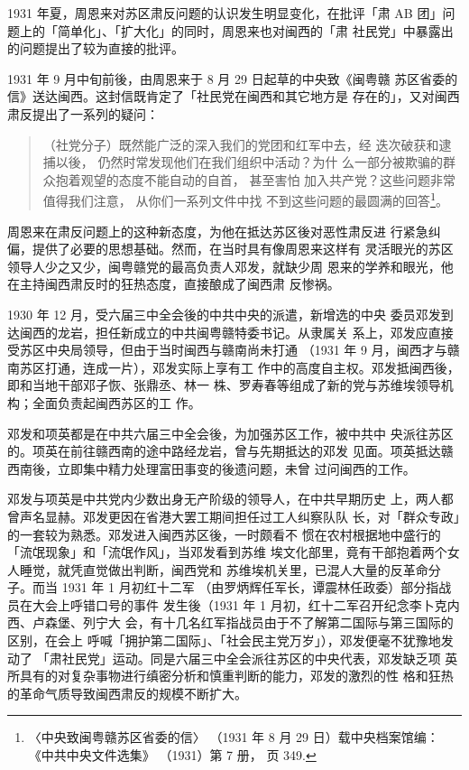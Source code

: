 1931 年夏，周恩来对苏区肃反问题的认识发生明显变化，在批评「肃
AB 团」问题上的「简单化」、「扩大化」的同时，周恩来也对闽西的「肃
社民党」中暴露出的问题提出了较为直接的批评。
 
1931 年 9 月中旬前後，由周恩来于 8 月 29 日起草的中央致《闽粤赣
苏区省委的信》送达闽西。这封信既肯定了「社民党在闽西和其它地方是
存在的」，又对闽西肃反提出了一系列的疑问：
\begin{quote}
	\fzwkai （社党分子）既然能广泛的深入我们的党团和红军中去，经
迭次破获和逮捕以後，
仍然时常发现他们在我们组织中活动？为什
么一部分被欺骗的群众抱着观望的态度不能自动的自首，
甚至害怕
加入共产党？这些问题非常值得我们注意，
从你们一系列文件中找
不到这些问题的最圆满的回答\footnote{〈中央致闽粤赣苏区省委的信〉
（1931 年 8 月 29 日）载中央档案馆编：
《中共中央文件选集》
（1931）第 7 册，
页 349.}。
\end{quote}

周恩来在肃反问题上的这种新态度，为他在抵达苏区後对恶性肃反进
行紧急纠偏，提供了必要的思想基础。然而，在当时具有像周恩来这样有
灵活眼光的苏区领导人少之又少，闽粤赣党的最高负责人邓发，就缺少周
恩来的学养和眼光，他在主持闽西肃反时的狂热态度，直接酿成了闽西肃
反惨祸。

1930 年 12 月，受六届三中全会後的中共中央的派遣，新增选的中央
委员邓发到达闽西的龙岩，担任新成立的中共闽粤赣特委书记。从隶属关
系上，邓发应直接受苏区中央局领导，但由于当时闽西与赣南尚未打通
（1931 年 9 月，闽西才与赣南苏区打通，连成一片），邓发实际上享有工
作中的高度自主权。邓发抵闽西後，即和当地干部邓子恢、张鼎丞、林一
株、罗寿春等组成了新的党与苏维埃领导机构；全面负责起闽西苏区的工
作。

邓发和项英都是在中共六届三中全会後，为加强苏区工作，被中共中
央派往苏区的。项英在前往赣西南的途中路经龙岩，曾与先期抵达的邓发
见面。项英抵达赣西南後，立即集中精力处理富田事变的後遗问题，未曾
过问闽西的工作。

邓发与项英是中共党内少数出身无产阶级的领导人，在中共早期历史
上，两人都曾声名显赫。邓发更因在省港大罢工期间担任过工人纠察队队
长，对「群众专政」的一套较为熟悉。邓发进入闽西苏区後，一时颇看不
惯在农村根据地中盛行的「流氓现象」和「流氓作风」，当邓发看到苏维
埃文化部里，竟有干部抱着两个女人睡觉，就凭直觉做出判断，闽西党和
苏维埃机关里，已混人大量的反革命分子。而当 1931 年 1 月初红十二军
（由罗炳辉任军长，谭震林任政委）部分指战员在大会上呼错口号的事件
发生後（1931 年 1 月初，红十二军召开纪念李卜克内西、卢森堡、列宁大
会，有十几名红军指战员由于不了解第二国际与第三国际的区别，在会上
呼喊「拥护第二国际」、「社会民主党万岁」），邓发便毫不犹豫地发动了
「肃社民党」运动。同是六届三中全会派往苏区的中央代表，邓发缺乏项
英所具有的对复杂事物进行缜密分析和慎重判断的能力，邓发的激烈的性
格和狂热的革命气质导致闽西肃反的规模不断扩大。

